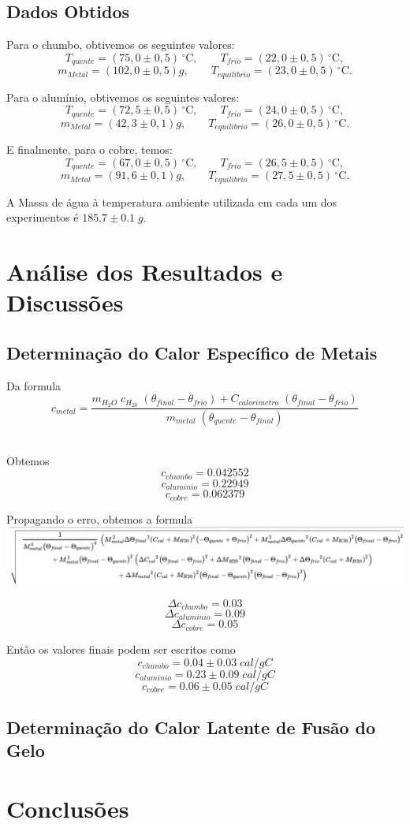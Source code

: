 \documentclass[12pt,a4paper]{article}
\begin{document}
\subsection{Dados Obtidos}

Para o chumbo, obtivemos os seguintes valores:
$$ T_{quente} = (75,0 \pm 0,5)\,^{\circ}\mathrm{C}, \qquad T_{frio} = (22,0 \pm 0,5)\,^{\circ}\mathrm{C}, $$
$$ m_{Metal} = (102,0 \pm 0,5)g, \qquad T_{equilibrio} = (23,0 \pm 0,5)\,^{\circ}\mathrm{C}. $$


Para o alumínio, obtivemos os seguintes valores:
$$ T_{quente} = (72,5 \pm 0,5)\,^{\circ}\mathrm{C}, \qquad T_{frio} = (24,0 \pm 0,5)\,^{\circ}\mathrm{C}, $$
$$ m_{Metal} = (42,3 \pm 0,1)g, \qquad T_{equilibrio} = (26,0 \pm 0,5)\,^{\circ}\mathrm{C}. $$


 E finalmente, para o cobre, temos:
$$ T_{quente} = (67,0 \pm 0,5)\,^{\circ}\mathrm{C}, \qquad T_{frio} = (26,5 \pm 0,5)\,^{\circ}\mathrm{C}, $$
$$ m_{Metal} = (91,6 \pm 0,1)g, \qquad T_{equilibrio} = (27,5 \pm 0,5)\,^{\circ}\mathrm{C}. $$

A Massa de água à temperatura ambiente utilizada em cada um dos experimentos é $185.7 \pm 0.1 \; g$.


\section{Análise dos Resultados e Discussões}

\subsection{Determinação do Calor Específico de Metais}
Da formula 
$$c_{metal} = \frac{m_{H_2O} \; c_{H_20} \;  (\theta_{final} - \theta_{frio}) + C_{calorimetro} \; (\theta_{final} - \theta_{frio})}{m_{metal} \;(\theta_{quente} - \theta_{final})}$$\

Obtemos 
$$ c_{chumbo} = 0.042552 $$
$$ c_{aluminio} = 0.22949 $$
$$ c_{cobre} = 0.062379 $$

Propagando o erro, obtemos a formula 
\includegraphics[scale=1]{formula.png}

$$ \Delta c_{chumbo} = 0.03 $$
$$ \Delta c_{aluminio} = 0.09 $$
$$ \Delta c_{cobre} = 0.05 $$

Então os valores finais podem ser escritos como 
$$ c_{chumbo} = 0.04 \pm 0.03 \; cal/gC$$
$$ c_{aluminio} = 0.23 \pm 0.09 \; cal/gC$$
$$ c_{cobre} = 0.06 \pm 0.05 \; cal/gC$$

\subsection{Determinação do Calor Latente de Fusão do Gelo}


\section{Conclusões}
\end{document}
